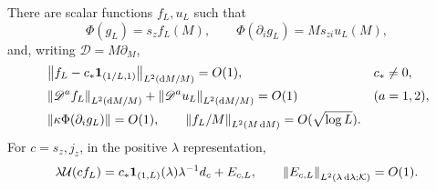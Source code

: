 \begin{lemma}\label{D:plateau-estimates}
There are scalar functions $f_L,u_L$ such that
\begin{equation}\label{D:plateau-waves}
 \Phi(g_L)=s_zf_L(M),\qquad
 \Phi(\partial_i g_L)=M s_{zi}u_L(M),
\end{equation}
and, writing $\mathscr D=M\partial_M$,
\begin{align}
 &\left\lVert f_L-c_*\mathbf1_{(1/L,1)}\right\rVert_{L^2(\mathrm d M/M)}=O(1),
 &&c_*\ne0,\label{D:plateau-main}\\
 &\left\lVert\mathscr D^a f_L\right\rVert_{L^2(\mathrm d M/M)}+
 \left\lVert\mathscr D^a u_L\right\rVert_{L^2(\mathrm d M/M)}=O(1)
 &&(a=1,2),\label{D:plateau-derivatives}\\
 &\left\lVert\kappa\Phi(\partial_i g_L)\right\rVert=O(1),\qquad
 \left\lVert f_L/M\right\rVert_{L^2(M\,\mathrm d M)}=O(\sqrt{\log L}).
 \label{D:plateau-norms}
\end{align}
For $c=s_z,j_z$, in the positive $\lambda$ representation,
\begin{equation}\label{D:plateau-tail}
 \lambda\mathcal U(c f_L)
 =c_*\mathbf1_{(1,L)}(\lambda)\lambda^{-1}d_c+E_{c,L},
 \qquad \left\lVert E_{c,L}\right\rVert_{L^2(\lambda\,\mathrm d\lambda;\mathcal K)}=O(1).
\end{equation}
\end{lemma}

